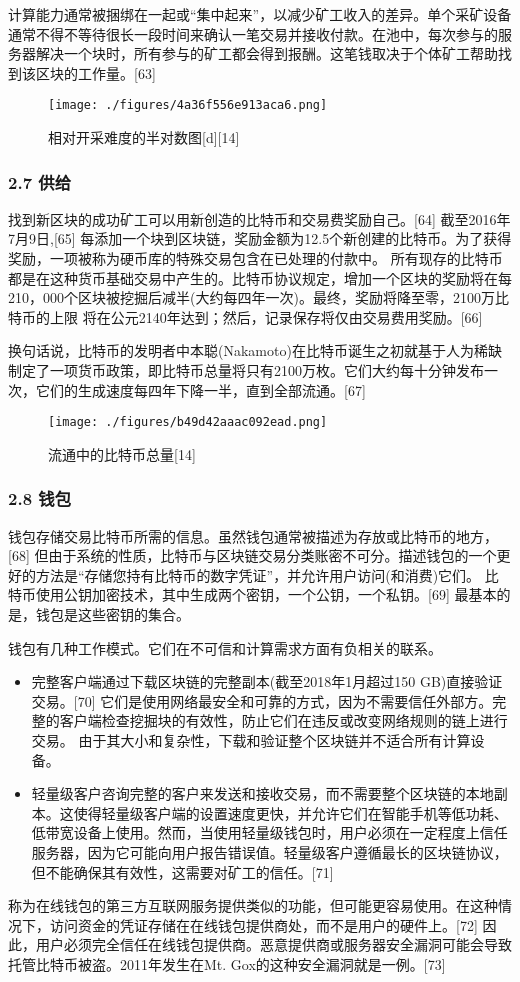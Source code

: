 计算能力通常被捆绑在一起或“集中起来”，以减少矿工收入的差异。单个采矿设备通常不得不等待很长一段时间来确认一笔交易并接收付款。在池中，每次参与的服务器解决一个块时，所有参与的矿工都会得到报酬。这笔钱取决于个体矿工帮助找到该区块的工作量。[63]
\begin{figure}[ht]
\centering
\texttt{[image: ./figures/4a36f556e913aca6.png]}
\caption{相对开采难度的半对数图[d][14]} \label{fig_BTC_6}
\end{figure}
\subsubsection{2.7 供给}
找到新区块的成功矿工可以用新创造的比特币和交易费奖励自己。[64] 截至2016年7月9日,[65] 每添加一个块到区块链，奖励金额为12.5个新创建的比特币。为了获得奖励，一项被称为硬币库的特殊交易包含在已处理的付款中。 所有现存的比特币都是在这种货币基础交易中产生的。比特币协议规定，增加一个区块的奖励将在每210，000个区块被挖掘后减半(大约每四年一次)。最终，奖励将降至零，2100万比特币的上限 将在公元2140年达到；然后，记录保存将仅由交易费用奖励。[66]

换句话说，比特币的发明者中本聪(Nakamoto)在比特币诞生之初就基于人为稀缺制定了一项货币政策，即比特币总量将只有2100万枚。它们大约每十分钟发布一次，它们的生成速度每四年下降一半，直到全部流通。[67]
\begin{figure}[ht]
\centering
\texttt{[image: ./figures/b49d42aaac092ead.png]}
\caption{流通中的比特币总量[14]} \label{fig_BTC_7}
\end{figure}
\subsubsection{2.8 钱包}
钱包存储交易比特币所需的信息。虽然钱包通常被描述为存放或比特币的地方，[68] 但由于系统的性质，比特币与区块链交易分类账密不可分。描述钱包的一个更好的方法是“存储您持有比特币的数字凭证”，并允许用户访问(和消费)它们。 比特币使用公钥加密技术，其中生成两个密钥，一个公钥，一个私钥。[69] 最基本的是，钱包是这些密钥的集合。

钱包有几种工作模式。它们在不可信和计算需求方面有负相关的联系。
\begin{itemize}
\item 完整客户端通过下载区块链的完整副本(截至2018年1月超过150 GB)直接验证交易。[70] 它们是使用网络最安全和可靠的方式，因为不需要信任外部方。完整的客户端检查挖掘块的有效性，防止它们在违反或改变网络规则的链上进行交易。 由于其大小和复杂性，下载和验证整个区块链并不适合所有计算设备。
\item 轻量级客户咨询完整的客户来发送和接收交易，而不需要整个区块链的本地副本。这使得轻量级客户端的设置速度更快，并允许它们在智能手机等低功耗、低带宽设备上使用。然而，当使用轻量级钱包时，用户必须在一定程度上信任服务器，因为它可能向用户报告错误值。轻量级客户遵循最长的区块链协议，但不能确保其有效性，这需要对矿工的信任。[71]
\end{itemize}
称为在线钱包的第三方互联网服务提供类似的功能，但可能更容易使用。在这种情况下，访问资金的凭证存储在在线钱包提供商处，而不是用户的硬件上。[72] 因此，用户必须完全信任在线钱包提供商。恶意提供商或服务器安全漏洞可能会导致托管比特币被盗。2011年发生在Mt. Gox的这种安全漏洞就是一例。[73]


